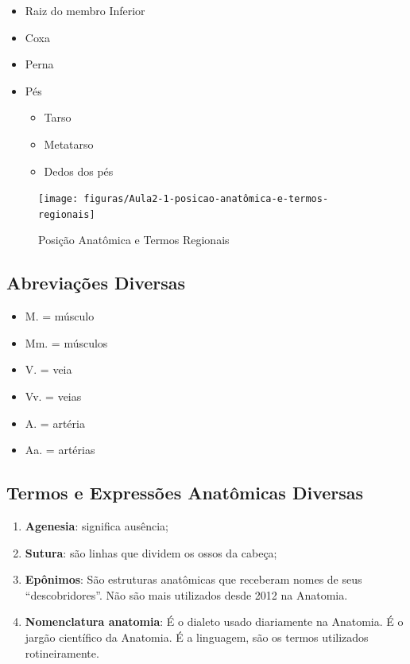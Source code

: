 \documentclass[
]{book}
\providecommand{\tightlist}{%
  \setlength{\itemsep}{0pt}\setlength{\parskip}{0pt}}
\begin{document}
\begin{enumerate}
  \begin{itemize}
  \tightlist
  \item
    Raiz do membro Inferior
  \item
    Coxa
  \item
    Perna
  \item
    Pés

    \begin{itemize}
    \tightlist
    \item
      Tarso
    \item
      Metatarso
    \item
      Dedos dos pés
    \end{itemize}
  \end{itemize}
\end{enumerate}

\begin{figure}

{\centering \texttt{[image: figuras/Aula2-1-posicao-anatômica-e-termos-regionais]} 

}

\caption{Posição Anatômica e Termos Regionais}\label{fig:unnamed-chunk-2}
\end{figure}

\hypertarget{abreviauxe7uxf5es-diversas}{%
\subsection{Abreviações Diversas}\label{abreviauxe7uxf5es-diversas}}

\begin{itemize}
\tightlist
\item
  M. = músculo
\item
  Mm. = músculos
\item
  V. = veia
\item
  Vv. = veias
\item
  A. = artéria
\item
  Aa. = artérias
\end{itemize}

\hypertarget{termos-e-expressuxf5es-anatuxf4micas-diversas}{%
\subsection{Termos e Expressões Anatômicas Diversas}\label{termos-e-expressuxf5es-anatuxf4micas-diversas}}

\begin{enumerate}
\def\labelenumi{\arabic{enumi}.}
\tightlist
\item
  \textbf{Agenesia}: significa ausência;
\item
  \textbf{Sutura}: são linhas que dividem os ossos da cabeça;
\item
  \textbf{Epônimos}: São estruturas anatômicas que receberam nomes de seus ``descobridores''. Não são mais utilizados desde 2012 na Anatomia.
\item
  \textbf{Nomenclatura anatomia}: É o dialeto usado diariamente na Anatomia. É o jargão científico da Anatomia. É a linguagem, são os termos utilizados rotineiramente.
\end{enumerate}
\end{document}
